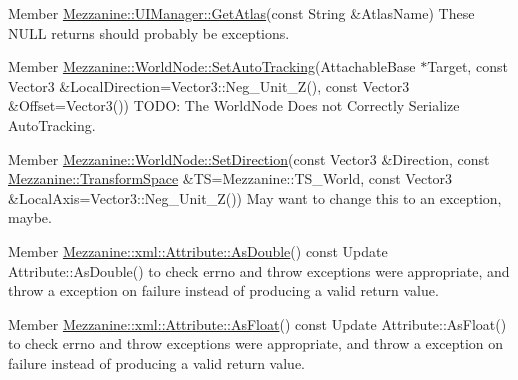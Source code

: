 \label{todo__todo000036}
\hypertarget{todo__todo000036}{}
 
\begin{DoxyDescription}
\item[Member \hyperlink{classMezzanine_1_1UIManager_a904d4d7a3957a13cf5e27e8d97dd1add}{Mezzanine::UIManager::GetAtlas}(const String \&AtlasName) ]These NULL returns should probably be exceptions. 
\end{DoxyDescription}

\label{todo__todo000047}
\hypertarget{todo__todo000047}{}
 
\begin{DoxyDescription}
\item[Member \hyperlink{classMezzanine_1_1WorldNode_a417e459d58c4d612bcbbe98a328c7b50}{Mezzanine::WorldNode::SetAutoTracking}(AttachableBase $\ast$Target, const Vector3 \&LocalDirection=Vector3::Neg\_\-Unit\_\-Z(), const Vector3 \&Offset=Vector3()) ]TODO: The WorldNode Does not Correctly Serialize AutoTracking. 
\end{DoxyDescription}

\label{todo__todo000046}
\hypertarget{todo__todo000046}{}
 
\begin{DoxyDescription}
\item[Member \hyperlink{classMezzanine_1_1WorldNode_ab088981b0bea9d73e9bfaac5f237abc8}{Mezzanine::WorldNode::SetDirection}(const Vector3 \&Direction, const \hyperlink{namespaceMezzanine_ad81c74de3529f1e643bd145173924ed3}{Mezzanine::TransformSpace} \&TS=Mezzanine::TS\_\-World, const Vector3 \&LocalAxis=Vector3::Neg\_\-Unit\_\-Z()) ]May want to change this to an exception, maybe. 
\end{DoxyDescription}

\label{todo__todo000058}
\hypertarget{todo__todo000058}{}
 
\begin{DoxyDescription}
\item[Member \hyperlink{classMezzanine_1_1xml_1_1Attribute_af7c9a4dd3907c53875b60fffd0737731}{Mezzanine::xml::Attribute::AsDouble}() const  ]Update Attribute::AsDouble() to check errno and throw exceptions were appropriate, and throw a exception on failure instead of producing a valid return value. 
\end{DoxyDescription}

\label{todo__todo000059}
\hypertarget{todo__todo000059}{}
 
\begin{DoxyDescription}
\item[Member \hyperlink{classMezzanine_1_1xml_1_1Attribute_a0b941b115c4ee1a2e9bcffd044a32a86}{Mezzanine::xml::Attribute::AsFloat}() const  ]Update Attribute::AsFloat() to check errno and throw exceptions were appropriate, and throw a exception on failure instead of producing a valid return value. 
\end{DoxyDescription}

